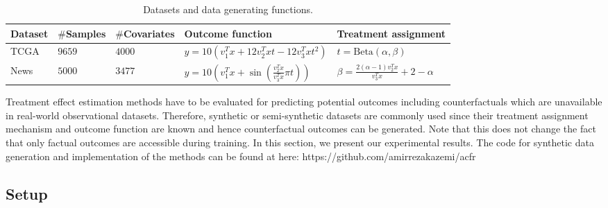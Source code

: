 \documentclass[letterpaper]{article} %
\begin{document}
\begin{table}[ht]
	\centering
	\small
	\begin{tabular}
        {>{\centering\arraybackslash}p{1.5cm}
        >{\centering\arraybackslash}p{1.5cm}
        >{\centering\arraybackslash}p{2cm}
        >{\centering\arraybackslash}p{6cm}
        >{\centering\arraybackslash}p{4cm}}
		\toprule
		Dataset & $\#$Samples & $\#$Covariates & Outcome function & Treatment assignment \\
		\midrule
		TCGA & $9659$ & $4000$ & $y = 10 (v_1^Tx + 12v_2^Txt -12 v_3^Txt^2)$ & $t = \text{Beta}(\alpha, \beta)$ \\
		\cmidrule{1-4}
		News & $5000$ & $3477$ & $y = 10(v_1^Tx + \sin( \frac{v_2^Tx}{v_3^Tx}\pi t))$ & $\beta = \frac{2(\alpha - 1)v_2^Tx}{v_3^Tx} + 2 - \alpha$ \\
		\bottomrule
	\end{tabular}
	\caption{Datasets and data generating functions.
        \label{data}}
\end{table}
Treatment effect estimation methods have to be evaluated for predicting potential outcomes including counterfactuals which are unavailable in real-world observational datasets. Therefore, synthetic or semi-synthetic datasets are commonly used since their treatment assignment mechanism and outcome function are known and hence counterfactual outcomes can be generated. Note that this does not change the fact that only factual outcomes are accessible during training. In this section, we present our experimental results.
The code for synthetic data generation and implementation of the methods can be found at here: https://github.com/amirrezakazemi/acfr
\subsection{Setup}
\end{document}
